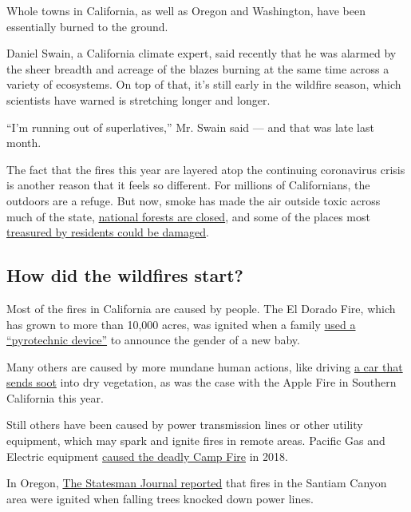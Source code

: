 Whole towns in California, as well as Oregon and Washington, have been
essentially burned to the ground.

Daniel Swain, a California climate expert, said recently that he was
alarmed by the sheer breadth and acreage of the blazes burning at the
same time across a variety of ecosystems. On top of that, it's still
early in the wildfire season, which scientists have warned is stretching
longer and longer.

``I'm running out of superlatives,'' Mr. Swain said --- and that was
late last month.

The fact that the fires this year are layered atop the continuing
coronavirus crisis is another reason that it feels so different. For
millions of Californians, the outdoors are a refuge. But now, smoke has
made the air outside toxic across much of the state,
\href{https://www.fs.usda.gov/detail/r5/news-events/?cid=FSEPRD799162}{national
forests are closed}, and some of the places most
\href{https://www.nytimes3xbfgragh.onion/2020/08/28/us/california-fires-big-basin-redwoods.html}{treasured
by residents could be damaged}.

\hypertarget{how-did-the-wildfires-start}{%
\subsection{How did the wildfires
start?}\label{how-did-the-wildfires-start}}

Most of the fires in California are caused by people. The El Dorado
Fire, which has grown to more than 10,000 acres, was ignited when a
family
\href{https://www.nytimes3xbfgragh.onion/2020/09/07/us/gender-reveal-party-wildfire.html}{used
a ``pyrotechnic device''} to announce the gender of a new baby.

Many others are caused by more mundane human actions, like driving
\href{https://www.nbcnews.com/news/us-news/vehicle-malfunction-behind-giant-apple-wildfire-california-officials-say-n1235711}{a
car that sends soot} into dry vegetation, as was the case with the Apple
Fire in Southern California this year.

Still others have been caused by power transmission lines or other
utility equipment, which may spark and ignite fires in remote areas.
Pacific Gas and Electric equipment
\href{https://www.nytimes3xbfgragh.onion/2019/05/15/business/pge-fire.html}{caused
the deadly Camp Fire} in 2018.

In Oregon,
\href{https://www.statesmanjournal.com/story/news/2020/09/08/oregon-wildfires-santiam-canyon-fires-caused-downed-power-lines/5744657002/}{The
Statesman Journal reported} that fires in the Santiam Canyon area were
ignited when falling trees knocked down power lines.


